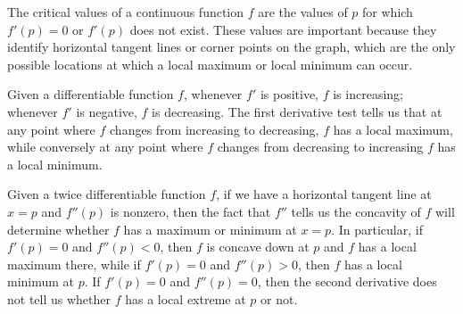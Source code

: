 \begin{summary}
\item The critical values of a continuous function $f$ are the values of $p$ for which $f'(p) = 0$ or $f'(p)$ does not exist.  These values are important because they identify horizontal tangent lines or corner points on the graph, which are the only possible locations at which a local maximum or local minimum can occur.
\item Given a differentiable function $f$, whenever $f'$ is positive, $f$ is increasing; whenever $f'$ is negative, $f$ is decreasing.  The first derivative test tells us that at any point where $f$ changes from increasing to decreasing, $f$ has a local maximum, while conversely at any point where $f$ changes from decreasing to increasing $f$ has a local minimum.
\item Given a twice differentiable function $f$, if we have a horizontal tangent line at $x = p$ and $f''(p)$ is nonzero, then the fact that $f''$ tells us the concavity of $f$ will determine whether $f$ has a maximum or minimum at $x = p$.  In particular, if $f'(p) = 0$ and $f''(p) < 0$, then $f$ is concave down at $p$ and $f$ has a local maximum there, while if $f'(p) = 0$ and $f''(p) > 0$, then $f$ has a local minimum at $p$.  If $f'(p) = 0$ and $f''(p) = 0$, then the second derivative does not tell us whether $f$ has a local extreme at $p$ or not.
\end{summary}

\clearpage

 

\cleardoublepage